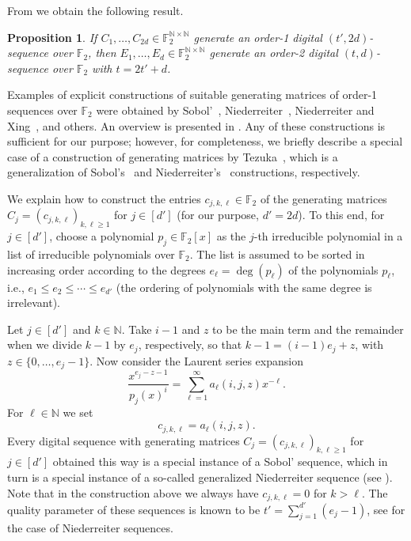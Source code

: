 \documentclass[12pt, a4paper]{article}
\newtheorem{prop}[thm]{Proposition}
\newcommand{\nicolas}[1]{\begingroup\color{teal}#1\endgroup}
\newcommand{\N}{{\mathbb{N}}} %
\newcommand{\bbF}{{\mathbb{F}}}
\begin{document}
From \cite[Theorems~4.11 and~4.12]{D07} we obtain the following result.

\begin{prop}
If $C_1,\ldots,C_{2d} \in\mathbb{F}_2^{\N \times \N}$ generate an order-1 digital $(t',2d)$-sequence over $\mathbb{F}_2$, then $E_1,\ldots,E_d \in\mathbb{F}_2^{\N \times \N}$ generate an order-2 digital $(t,d)$-sequence over $\mathbb{F}_2$ with $t = 2 t' + d$.
\end{prop}

Examples of explicit constructions of suitable generating matrices of order-1 sequences over $\mathbb{F}_2$ were obtained by %
Sobol'~\cite{S67}, Niederreiter~\cite{N87,N92}, Niederreiter and Xing~\cite{NX96}, and others. An overview is presented in \cite[Chapter~8]{DP10}. Any of these constructions is sufficient for our purpose; however, for completeness, we briefly describe a special case of a construction of generating matrices by Tezuka~\cite{T93}, which is a generalization of Sobol's~\cite{S67} and Niederreiter's~\cite{N87} constructions, respectively. 

We explain how to construct the entries $c_{j,k,\ell} \in \mathbb{F}_2$ of the generating matrices $C_j = (c_{j,k,\ell})_{k,\ell \ge 1}$ for $j \in [d']$ (for our purpose, $d'=2d$). To this end, for $j \in [d']$, choose a polynomial $p_j \in \mathbb{F}_2[x]$ as the $j$-th irreducible polynomial in a list of irreducible polynomials over $\mathbb{F}_2$. The list is assumed to be  sorted in increasing order according to the degrees $e_\ell = \deg(p_\ell)$ of the polynomials $p_\ell$, i.e., $e_1 \le e_2 \le \cdots \le e_{d'}$ (the ordering of polynomials with the same degree is irrelevant). 

Let $j \in [d']$ and $k \in \mathbb{N}$. Take $i-1$ and $z$ to be the main term and the remainder when we divide $k-1$ by $e_j$, respectively, so that $k-1  = (i-1) e_j + z$, with $z \in \{0,\ldots,e_j-1\}$. Now consider the Laurent series expansion %
\begin{equation*}
\frac{x^{e_j-z-1}}{p_j(x)^i} = \sum_{\ell =1}^\infty a_\ell(i,j,z) x^{-\ell}. %
\end{equation*}
For $\ell \in \mathbb{N}$ we set 
\begin{equation*}%
c_{j,k,\ell} = a_\ell(i,j,z).
\end{equation*}
Every digital sequence with generating matrices $C_j = (c_{j,k,\ell})_{k,\ell \ge 1}$ for $j \in [d']$ obtained this way is a special instance of a Sobol' sequence, which in turn is a special instance of a so-called generalized Niederreiter sequence (see \cite[Equation~(3)]{T93}). Note that in the construction above we always have $c_{j,k,\ell}=0$ for $k > \ell$. The quality parameter of these sequences is known to be $t' = \sum_{j=1}^{d'} (e_j-1)$, see \cite[Chapter~4.5]{N92} for the case of Niederreiter sequences.
\end{document}
